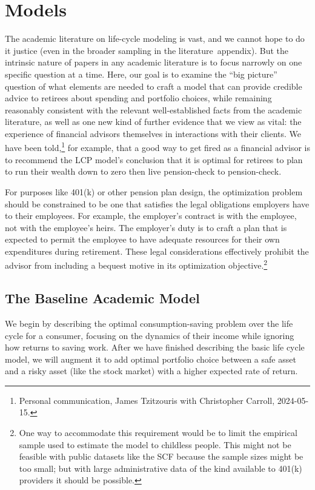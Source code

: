 \documentclass{article}
\begin{document}
\section{Models}

The academic literature on life-cycle modeling is vast, and we cannot hope to do it justice (even in the broader sampling in the literature~appendix).
But the intrinsic nature of papers in any academic literature is to focus narrowly on one specific question at a time.
Here, our goal is to examine the ``big picture'' question of what elements are needed to craft a model that can provide credible advice to retirees about spending and portfolio choices, while remaining reasonably consistent with the relevant well-established facts from the academic literature, as well as one new kind of further evidence that we view as vital: the experience of financial advisors themselves in interactions with their clients.
We have been told,\footnote{Personal communication, James Tzitzouris with Christopher Carroll, 2024-05-15.} for example, that a good way to get fired as a financial advisor is to recommend the LCP model's conclusion that it is optimal for retirees to plan to run their wealth down to zero then live pension-check to pension-check.

For purposes like 401(k) or other pension plan design, the optimization problem should be constrained to be one that satisfies the legal obligations employers have to their employees.
For example, the employer's contract is with the employee, not with the employee's heirs.
The employer's duty is to craft a plan that is expected to permit the employee to have adequate resources for their own expenditures during retirement.
These legal considerations effectively prohibit the advisor from including a bequest motive in its optimization objective.\footnote{One way to accommodate this requirement would be to limit the empirical sample used to estimate the model to childless people.
This might not be feasible with public datasets like the SCF because the sample sizes might be too small; but with large administrative data of the kind available to 401(k) providers it should be possible.}

\subsection{The Baseline Academic Model}

We begin by describing the optimal consumption-saving problem over the life cycle for a consumer, focusing on the dynamics of their income while ignoring how returns to saving work.
After we have finished describing the basic life cycle model, we will augment it to add optimal portfolio choice between a safe asset and a risky asset (like the stock market) with a higher expected rate of return.
\end{document}
